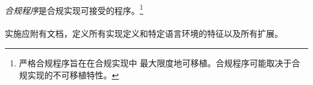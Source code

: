 \paragraph{}
\textit{合规程序}是合规实现可接受的程序。\footnote{严格合规程序旨在在合规实现中
最大限度地可移植。合规程序可能取决于合规实现的不可移植特性。}

\paragraph{}
实施应附有文档，定义所有实现定义和特定语言环境的特征以及所有扩展。


